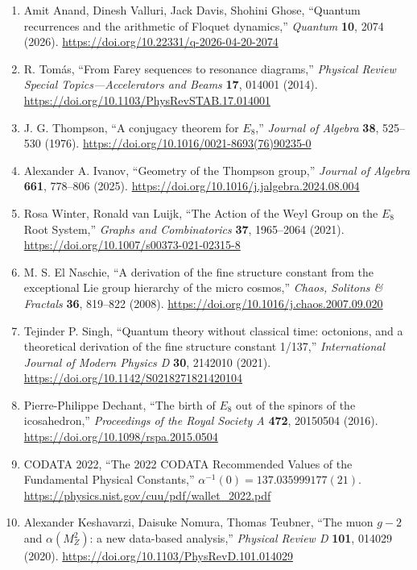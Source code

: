 \documentclass[
  10pt,
  a4paper,
]{article}
\providecommand{\tightlist}{%
  \setlength{\itemsep}{0pt}\setlength{\parskip}{0pt}}
\begin{document}
\begin{enumerate}
\def\labelenumi{\arabic{enumi}.}
\setcounter{enumi}{4}
\tightlist
\item
  Amit Anand, Dinesh Valluri, Jack Davis, Shohini Ghose, ``Quantum
  recurrences and the arithmetic of Floquet dynamics,'' \emph{Quantum}
  \textbf{10}, 2074 (2026).
  \url{https://doi.org/10.22331/q-2026-04-20-2074}
\item
  R. Tomás, ``From Farey sequences to resonance diagrams,''
  \emph{Physical Review Special Topics---Accelerators and Beams}
  \textbf{17}, 014001 (2014).
  \url{https://doi.org/10.1103/PhysRevSTAB.17.014001}
\item
  J. G. Thompson, ``A conjugacy theorem for \(E_8\),'' \emph{Journal of
  Algebra} \textbf{38}, 525--530 (1976).
  \url{https://doi.org/10.1016/0021-8693(76)90235-0}
\item
  Alexander A. Ivanov, ``Geometry of the Thompson group,'' \emph{Journal
  of Algebra} \textbf{661}, 778--806 (2025).
  \url{https://doi.org/10.1016/j.jalgebra.2024.08.004}
\item
  Rosa Winter, Ronald van Luijk, ``The Action of the Weyl Group on the
  \(E_8\) Root System,'' \emph{Graphs and Combinatorics} \textbf{37},
  1965--2064 (2021). \url{https://doi.org/10.1007/s00373-021-02315-8}
\item
  M. S. El Naschie, ``A derivation of the fine structure constant from
  the exceptional Lie group hierarchy of the micro cosmos,''
  \emph{Chaos, Solitons \& Fractals} \textbf{36}, 819--822 (2008).
  \url{https://doi.org/10.1016/j.chaos.2007.09.020}
\item
  Tejinder P. Singh, ``Quantum theory without classical time: octonions,
  and a theoretical derivation of the fine structure constant 1/137,''
  \emph{International Journal of Modern Physics D} \textbf{30}, 2142010
  (2021). \url{https://doi.org/10.1142/S0218271821420104}
\item
  Pierre-Philippe Dechant, ``The birth of \(E_8\) out of the spinors of
  the icosahedron,'' \emph{Proceedings of the Royal Society A}
  \textbf{472}, 20150504 (2016).
  \url{https://doi.org/10.1098/rspa.2015.0504}
\item
  CODATA 2022, ``The 2022 CODATA Recommended Values of the Fundamental
  Physical Constants,'' \(\alpha^{-1}(0)=137.035999177(21)\).
  \url{https://physics.nist.gov/cuu/pdf/wallet_2022.pdf}
\item
  Alexander Keshavarzi, Daisuke Nomura, Thomas Teubner, ``The muon
  \(g-2\) and \(\alpha(M_Z^2)\): a new data-based analysis,''
  \emph{Physical Review D} \textbf{101}, 014029 (2020).
  \url{https://doi.org/10.1103/PhysRevD.101.014029}
\end{enumerate}
\end{document}
